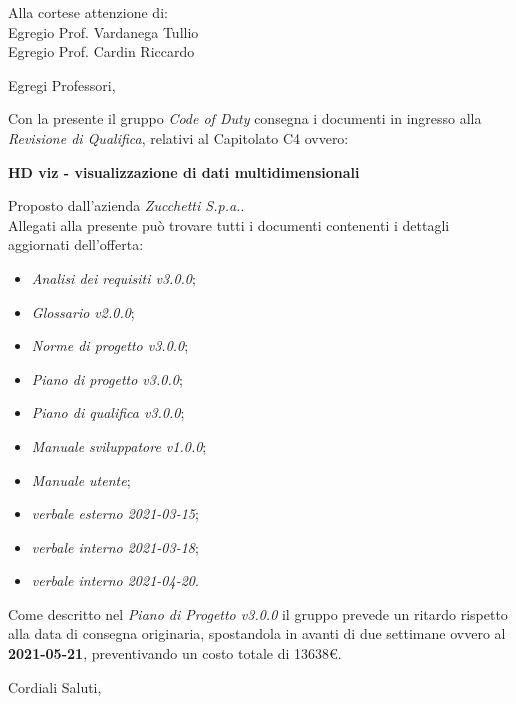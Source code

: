 \documentclass[11pt]{letter}
\begin{document}
\begin{letter}{Alla cortese attenzione di: \\ Egregio Prof. Vardanega Tullio \\ Egregio Prof. Cardin Riccardo}
\date{21 Aprile, 2021}
\opening{Egregi Professori,}
Con la presente il gruppo \textit{Code of Duty} consegna i documenti in ingresso alla \textit{Revisione di Qualifica}, relativi al Capitolato C4 ovvero:
\begin{center}
    \textbf{HD viz -  visualizzazione di dati multidimensionali}
\end{center}
Proposto dall'azienda \textit{Zucchetti S.p.a.}.\\
Allegati alla presente può trovare tutti i documenti contenenti i dettagli aggiornati dell'offerta:
\begin{itemize}
    \item \textit{Analisi dei requisiti v3.0.0};
    \item \textit{Glossario v2.0.0};
    \item \textit{Norme di progetto v3.0.0};
    \item \textit{Piano di progetto v3.0.0};
    \item \textit{Piano di qualifica v3.0.0};
    \item \textit{Manuale sviluppatore v1.0.0};
    \item \textit{Manuale utente};
    \item \textit{verbale esterno 2021-03-15};
    \item \textit{verbale interno 2021-03-18};
    \item \textit{verbale interno 2021-04-20}.
\end{itemize}

\pagebreak

Come descritto nel \textit{Piano di Progetto v3.0.0} il gruppo prevede un ritardo rispetto alla data di consegna originaria, spostandola in avanti di due settimane ovvero al \textbf{2021-05-21}, preventivando un costo totale di 13638€.
\closing{Cordiali Saluti,}
\end{letter}
\end{document}
